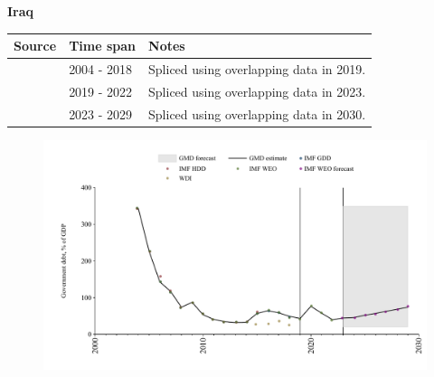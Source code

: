 \documentclass[12pt,a4paper,landscape]{article}
\begin{document}
\begin{adjustbox}{max totalsize={\paperwidth}{\paperheight},center}
\begin{minipage}[t][\textheight][t]{\textwidth}
\vspace*{0.5cm}
{}
\begin{center}
{\Large\bfseries Iraq}
\end{center}
\vspace{0.5cm}
\begin{table}[H]
\centering
\small
\begin{tabular}{|l|l|l|}
\hline
\textbf{Source} & \textbf{Time span} & \textbf{Notes} \\
\hline
\rowcolor{white}\cite{IMF_GDD}& 2004 - 2018 &Spliced using overlapping data in 2019.\\
\rowcolor{lightgray}\cite{IMF_WEO}& 2019 - 2022 &Spliced using overlapping data in 2023.\\
\rowcolor{white}\cite{IMF_WEO_forecast}& 2023 - 2029 &Spliced using overlapping data in 2030.\\
\hline
\end{tabular}
\end{table}
\begin{figure}[H]
\centering
\includegraphics[width=\textwidth,height=0.6\textheight,keepaspectratio]{graphs/IRQ_govdebt_GDP.pdf}
\end{figure}
\end{minipage}
\end{adjustbox}
\end{document}
